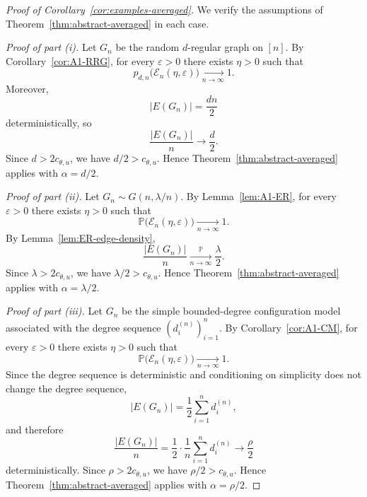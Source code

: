 \documentclass[11pt]{article}
\theoremstyle{remark}
\theoremstyle{plain}
\newcommand{\Pbb}{\mathbb{P}}
\newcommand{\1}{\mathbbm{1}}
\begin{document}
\begin{proof}[Proof of Corollary~\ref{cor:examples-averaged}]
We verify the assumptions of Theorem~\ref{thm:abstract-averaged} in each case.

\smallskip
\noindent\textit{Proof of part \textnormal{(i)}.}
Let \(G_n\) be the random \(d\)-regular graph on \([n]\). By
Corollary~\ref{cor:A1-RRG}, for every \(\varepsilon>0\) there exists \(\eta>0\) such that
\[
p_{d,n}\bigl(\mathcal E_n(\eta,\varepsilon)\bigr)\xrightarrow[n\to\infty]{}1.
\]
Moreover,
\[
|E(G_n)|=\frac{dn}{2}
\]
deterministically, so
\[
\frac{|E(G_n)|}{n}\to \frac d2.
\]
Since \(d>2c_{\theta,u}\), we have \(d/2>c_{\theta,u}\). Hence
Theorem~\ref{thm:abstract-averaged} applies with \(\alpha=d/2\).

\smallskip
\noindent\textit{Proof of part \textnormal{(ii)}.}
Let \(G_n\sim G(n,\lambda/n)\). By Lemma~\ref{lem:A1-ER}, for every \(\varepsilon>0\) there
exists \(\eta>0\) such that
\[
\Pbb\bigl(\mathcal E_n(\eta,\varepsilon)\bigr)\xrightarrow[n\to\infty]{}1.
\]
By Lemma~\ref{lem:ER-edge-density},
\[
\frac{|E(G_n)|}{n}\xrightarrow[n\to\infty]{\Pbb}\frac{\lambda}{2}.
\]
Since \(\lambda>2c_{\theta,u}\), we have \(\lambda/2>c_{\theta,u}\). Hence
Theorem~\ref{thm:abstract-averaged} applies with \(\alpha=\lambda/2\).

\smallskip
\noindent\textit{Proof of part \textnormal{(iii)}.}
Let \(G_n\) be the simple bounded-degree configuration model associated with the degree sequence
\((d_i^{(n)})_{i=1}^n\). By Corollary~\ref{cor:A1-CM}, for every \(\varepsilon>0\) there exists
\(\eta>0\) such that
\[
\Pbb\bigl(\mathcal E_n(\eta,\varepsilon)\bigr)\xrightarrow[n\to\infty]{}1.
\]
Since the degree sequence is deterministic and conditioning on simplicity does not change the
degree sequence,
\[
|E(G_n)|=\frac12\sum_{i=1}^n d_i^{(n)},
\]
and therefore
\[
\frac{|E(G_n)|}{n}
=
\frac12\cdot \frac1n\sum_{i=1}^n d_i^{(n)}
\longrightarrow \frac{\rho}{2}
\]
deterministically. Since \(\rho>2c_{\theta,u}\), we have \(\rho/2>c_{\theta,u}\). Hence
Theorem~\ref{thm:abstract-averaged} applies with \(\alpha=\rho/2\).
\end{proof}
\end{document}
